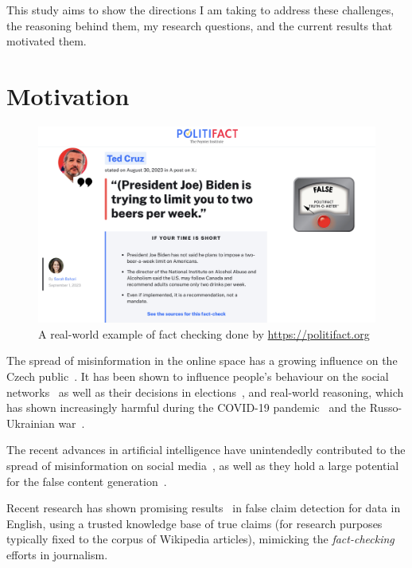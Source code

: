 This study aims to show the directions I am taking to address these challenges, the reasoning behind them, my research questions, and the current results that motivated them.

\section{Motivation}
\label{sec:motivation}

\begin{figure}
    \includegraphics[width=14cm]{fig/politifact.pdf}
    \caption{A real-world example of fact checking done by \url{https://politifact.org}}
    \label{fig:politifact}
\end{figure}

The spread of misinformation in the online space has a growing influence on the Czech public~\cite{stem}. It has been shown to influence people's behaviour on the social networks~\cite{Lazer1094} as well as their decisions in elections~\cite{10.1257/jep.31.2.211}, and real-world reasoning, which has shown increasingly harmful during the COVID-19 pandemic~\cite{BARUA2020100119} and the Russo-Ukrainian war~\cite{georgiana_stanescu_2022_6795674}.

The recent advances in artificial intelligence have unintendedly contributed to the spread of misinformation on social media~\cite{doi:10.1177/2056305119888654}, as well as they hold a large potential for the false content generation~\cite{glorin}.

Recent research has shown promising results~\cite{fever2} in false claim detection for data in English, using a trusted knowledge base of true claims (for research purposes typically fixed to the corpus of \textsf{Wikipedia} articles), mimicking the \textit{fact-checking} efforts in journalism.

